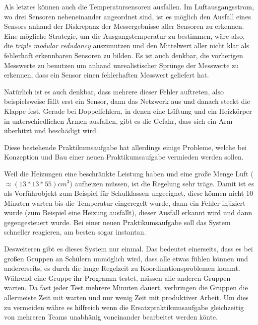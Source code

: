 Als letztes k{\"{o}}nnen auch die Temperatursensoren ausfallen. Im Luftausgangsstrom, wo drei Sensoren 
nebeneinander angeordnet sind, ist es m{\"{o}}glich den
Ausfall eines Sensors anhand der Diskrepanz der Messergebnisse aller Sensoren zu erkennen. Eine m{\"{o}}gliche 
Strategie, um die Ausgangstemperatur zu
bestimmen, w{\"{a}}re also, die \textit{triple modular redudancy} auszunutzen und den Mittelwert aller nicht klar als 
fehlerhaft erkennbaren Sensoren zu bilden.
Es ist auch denkbar, die vorherigen Messwerte zu benutzen um anhand unrealistischer Spr{\"{u}}nge der Messwerte zu 
erkennen, dass ein Sensor einen fehlerhaften Messwert geliefert hat.

Nat{\"{u}}rlich ist es auch denkbar, dass mehrere dieser Fehler auftreten, also beispielsweise f{\"{a}}llt
erst ein Sensor, dann das Netzwerk aus und danach steckt die Klappe fest.
Gerade bei Doppelfehlern, in denen eine L{\"{u}}ftung und ein Heizk{\"{o}}rper in unterschiedlichen {\"{A}}rmen 
ausfallen, gibt es die Gefahr, dass sich ein Arm {\"{u}}berhitzt und besch{\"{a}}digt wird.

Diese bestehende Praktikumsaufgabe hat allerdings einige Probleme, welche bei Konzeption und Bau einer neuen
Praktikumsaufgabe vermieden werden sollen.

Weil die Heizungen eine beschr{\"{a}}nkte Leistung haben und eine gro{\ss}e Menge Luft 
($ \approx (13*13*55)cm^3$) aufheizen m{\"{u}}ssen, ist die Regelung sehr tr{\"{a}}ge. Damit ist es als
Vorf{\"{u}}hrobjekt zum Beispiel f{\"{u}}r Schulklassen ungeeignet, diese k{\"{o}}nnen nicht 10 Minuten warten
bis die Temperatur eingeregelt wurde, dann ein Fehler injiziert wurde (zum Beispiel eine Heizung
ausf{\"{a}}llt), dieser Ausfall erkannt wird und dann gegengesteuert wurde. Bei einer neuen Praktikumsaufgabe
soll das System schneller reagieren, am besten sogar instantan.

Desweiteren gibt es dieses System nur einmal. Das bedeutet einerseits, dass es bei gro{\ss}en Gruppen
an Sch{\"{u}}lern unm{\"{o}}glich wird, dass alle etwas f{\"{u}}hlen k{\"{o}}nnen und andererseits, es durch
die lange Regelzeit zu Koordinationsproblemen kommt. W{\"{a}}hrend eine Gruppe ihr Programm testet, m{\"{u}}ssen
alle anderen Gruppen warten. Da fast jeder Test mehrere Minuten dauert, verbringen die Gruppen die
allermeiste Zeit mit warten und nur wenig Zeit mit produktiver Arbeit. Um dies zu vermeiden w{\"{a}}hre es
hilfreich wenn die Ersatzpraktikumsaufgabe gleichzeitig von mehreren Teams unabh{\"{a}}nig voneinander bearbeitet
werden k{\"{o}}nte.

